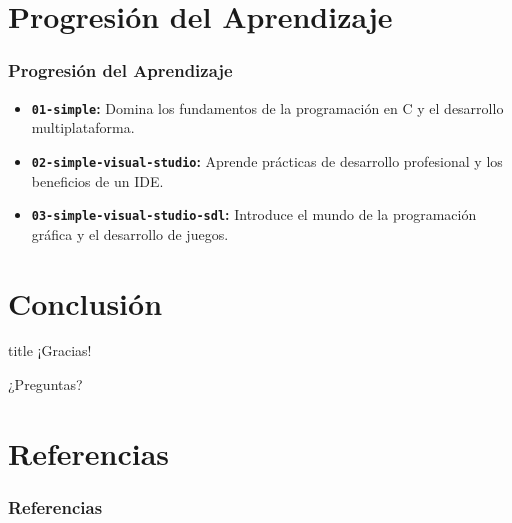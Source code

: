 \documentclass[]{beamer}
\begin{document}
\section{Progresión del Aprendizaje}
\begin{frame}
  \frametitle{Progresión del Aprendizaje}
  \begin{itemize}
    \item \textbf{\texttt{01-simple}:} Domina los fundamentos de la programación en C y el desarrollo multiplataforma.
    \item \textbf{\texttt{02-simple-visual-studio}:} Aprende prácticas de desarrollo profesional y los beneficios de un IDE.
    \item \textbf{\texttt{03-simple-visual-studio-sdl}:} Introduce el mundo de la programación gráfica y el desarrollo de juegos.
  \end{itemize}
\end{frame}

\section{Conclusión}
\begin{frame}
  \begin{center}
    \begin{beamercolorbox}[sep=8pt,center]{title}
      \Large{¡Gracias!}
    \end{beamercolorbox}
    \vspace{1em}
    \huge{¿Preguntas?}\\
    \vspace{1em}
    \small{\email}

  \end{center}
\end{frame}

{
\section{Referencias}
\begin{frame}[allowframebreaks]
  \frametitle{Referencias}
  
  
\end{frame}
}
\end{document}
